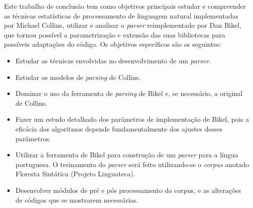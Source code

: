 Este trabalho de conclusão tem como objetivos principais estudar e compreender as técnicas estatísticas de processamento de linguagem natural implementadas por Michael Collins, utilizar e analisar o \emph{parser} reimplementado por Dan Bikel, que tornou possível a parametrização e extensão das suas bibliotecas para possíveis adaptações do código. Os objetivos específicos são os seguintes:

\begin{itemize}
	\item Estudar as técnicas envolvidas no desenvolvimento de um \emph{parser}.
	\item Estudar os modelos de \emph{parsing} de Collins.
	\item Dominar o uso da ferramenta de \emph{parsing} de Bikel e, se necessário, a original de Collins.
	\item Fazer um estudo detalhado dos parâmetros de implementação de Bikel, pois a eficácia dos algoritmos depende fundamentalmente dos ajustes desses parâmetros.
	\item Utilizar a ferramenta de Bikel para construção de um \emph{parser} para a língua portuguesa. O treinamento do \emph{parser} será feito utilizando-se o \emph{corpus} anotado Floresta Sintática (Projeto Linguateca).
	\item Desenvolver módulos de pré e pós processamento do corpus, e as alterações de códigos que se mostrarem necessárias.
\end{itemize}

